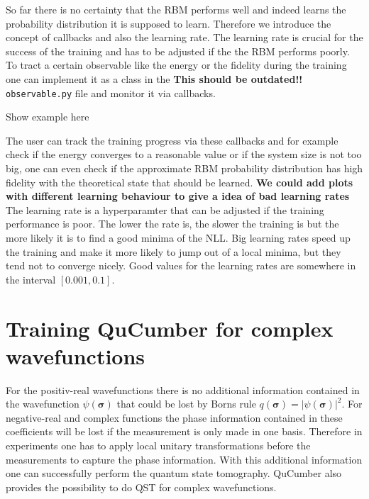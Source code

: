 \documentclass[submission, Phys]{SciPost}
\begin{document}
So far there is no certainty that the RBM performs well and indeed learns the probability distribution it is supposed to learn. Therefore we introduce the concept of callbacks and also the learning rate. The learning rate is crucial for the success of the training and has to be adjusted if the the RBM performs poorly.
To tract a certain observable like the energy or the fidelity during the training one can implement it as a class in the \textbf{This should be outdated!!} \verb|observable.py| file and monitor it via callbacks.

\begin{python}
Show example here
\end{python}

The user can track the training progress via these callbacks and for example check if the energy converges to a reasonable value or if the system size is not too big, one can even check if the approximate RBM probability distribution has high fidelity with the theoretical state that should be learned.
\textbf{We could add plots with different learning behaviour to give a idea of bad learning rates}
The learning rate is a hyperparamter that can be adjusted if the training performance is poor. The lower the rate is, the slower the training is but the more likely it is to find a good minima of the NLL. Big learning rates speed up the training and make it more likely to jump out of a local minima, but they tend not to converge nicely. Good values for the learning rates are somewhere in the interval $[0.001, 0.1 ]$.

\section{Training QuCumber for complex wavefunctions}
\label{Sec:Training_QuCumber_on_complex_wavefunctions}

For the positiv-real wavefunctions there is no additional information contained in the wavefunction $\psi( \boldsymbol{\sigma})$ that could be lost by Borns rule $q(\boldsymbol{\sigma}) = | \psi( \boldsymbol{\sigma} ) |^2$. For negative-real and complex functions the phase information contained in these coefficients will be lost if the measurement is only made in one basis. Therefore in experiments one has to apply local unitary transformations before the measurements to capture the phase information. With this additional information one can successfully perform the quantum state tomography.
QuCumber also provides the possibility to do QST for complex wavefunctions.
\end{document}
